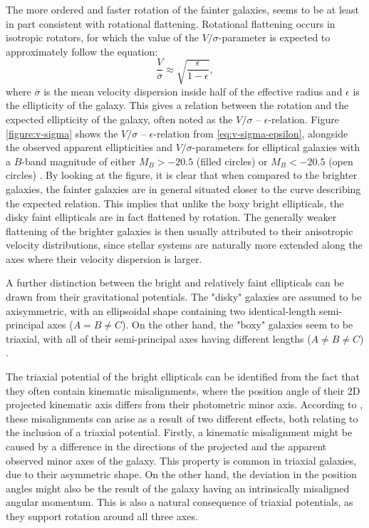 \documentclass[english, twoside]{HYgradu}
\begin{document}
The more ordered and faster rotation of the fainter galaxies, seems to be at least in part consistent with rotational flattening. Rotational flattening occurs in isotropic rotators, for which the value of the $V/\sigma$-parameter is expected to approximately follow the equation:
\begin{equation}
\frac{V}{\overline{\sigma}} \approx \sqrt{\frac{\epsilon}{1-\epsilon}}, \label{eq:v-sigma-epsilon}
\end{equation}
where $\overline{\sigma}$ is the mean velocity dispersion inside half of the effective radius and $\epsilon$ is the ellipticity of the galaxy. This gives a relation between the rotation and the expected ellipticity of the galaxy, often noted as the $V/\sigma$ – $\epsilon$-relation. Figure \ref{figure:v-sigma} shows the $V/\sigma$ – $\epsilon$-relation from \ref{eq:v-sigma-epsilon}, alongside the observed apparent ellipticities and $V/\sigma$-parameters for elliptical galaxies with a $B$-band magnitude of either $M_B > -20.5$ (filled circles) or $M_B < -20.5$ (open circles) \citep{Davies1983}. By looking at the figure, it is clear that when compared to the brighter galaxies, the fainter galaxies are in general situated closer to the curve describing the expected relation. This implies that unlike the boxy bright ellipticals, the disky faint ellipticals are in fact flattened by rotation. The generally weaker flattening of the brighter galaxies is then usually attributed to their anisotropic velocity distributions, since stellar systems are naturally more extended along the axes where their velocity dispersion is larger.

A further distinction between the bright and relatively faint ellipticals can be drawn from their gravitational potentials. The "disky" galaxies are assumed to be axisymmetric, with an ellipsoidal shape containing two identical-length semi-principal axes ($A = B \neq C$). On the other hand, the "boxy" galaxies seem to be triaxial, with all of their semi-principal axes having different lengths ($A \neq B \neq C$) \citep{GalaxyFormationAndEvo2010}. 

The triaxial potential of the bright ellipticals can be identified from the fact that they often contain kinematic misalignments, where the position angle of their 2D projected kinematic axis differs from their photometric minor axis. According to \cite{GalaxyFormationAndEvo2010}, these misalignments can arise as a result of two different effects, both relating to the inclusion of a triaxial potential. Firstly, a kinematic misalignment might be caused by a difference in the directions of the projected and the apparent observed minor axes of the galaxy. This property is common in triaxial galaxies, due to their asymmetric shape. On the other hand, the deviation in the position angles might also be the result of the galaxy having an intrinsically misaligned angular momentum. This is also a natural consequence of triaxial potentials, as they support rotation around all three axes. 
\end{document}
